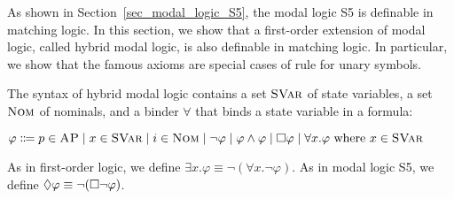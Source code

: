 \documentclass{amsart}
\begin{document}
As shown in Section~\ref{sec_modal_logic_S5},
the modal logic S5 is definable in matching logic.
In this section, we show that
a first-order extension of modal logic, called hybrid modal logic,
is also definable in matching logic.
In particular, we show that the famous  axioms are special cases
of rule \propagationexists for unary symbols.

The syntax of hybrid modal logic contains
a set ${\normalfont\textsc{SVar}}$ of state variables,
a set $\textnormal{\textsc{Nom}}$ of nominals,
and a binder $\forall$ that binds a state variable in a formula:
\begin{center}
	$\varphi \Coloneqq
	p \in \textsc{AP} \mid x \in {\normalfont\textsc{SVar}} \mid i \in \textnormal{\textsc{Nom}} \mid
	\neg \varphi \mid \varphi \wedge \varphi \mid
	{\square} \varphi \mid \forall x . \varphi \text{ where $x \in {\normalfont\textsc{SVar}}$}
	$
\end{center}
As in first-order logic,
we define $\exists x . \varphi \equiv \neg (\forall x . \neg \varphi)$.
As in modal logic S5,
we define ${\lozenge} \varphi \equiv \neg ({\square} \neg \varphi)$.
\end{document}
